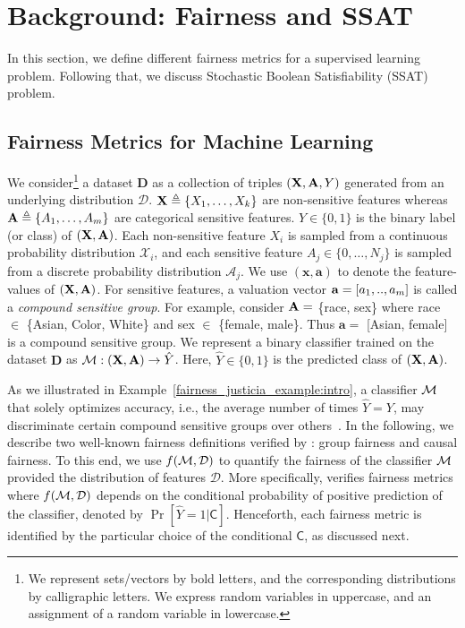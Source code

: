 \section{Background: Fairness and SSAT}
\label{fairness_justicia_sec:preliminaries}

In this section, we define different fairness metrics for a supervised learning problem. Following that, we discuss Stochastic Boolean Satisfiability (SSAT) problem.

\subsection{Fairness Metrics for Machine Learning}\label{fairness_justicia_sec:fairness}


We consider\footnote{{We represent sets/vectors by bold letters, and the corresponding distributions by calligraphic letters. We express random variables in uppercase, and an assignment of a random variable in lowercase.}} a dataset $ \mathbf{D} $ as a collection of triples $ (\mathbf{X}, \mathbf{A}, Y) $ generated from an underlying distribution $\mathcal{D}$. $ \mathbf{X} \triangleq \{X_1, \dots, X_{k}\} $ are non-sensitive features whereas $ \mathbf{A} \triangleq \{A_1, \dots, A_{m}\} $ are categorical sensitive features.  $Y \in \{0,1\}$ is the binary label (or class) of $(\mathbf{X},\mathbf{A})$. Each non-sensitive feature $ X_i$ is sampled from a continuous probability distribution {$ \mathcal{X}_i $}, and each sensitive feature $ A_j \in \{0, \dots, N_j\}  $ is sampled from a discrete probability distribution {$ \mathcal{A}_j $}. We use $ (\mathbf{x}, \mathbf{a}) $ to denote the feature-values of  $ (\mathbf{X}, \mathbf{A}) $.  For sensitive features, a valuation vector $ \mathbf{a} = [a_1, .., a_{m}] $ is called a \textit{compound sensitive group}. For example, consider $ \mathbf{A} = $ \{race, sex\} where race $ \in $ \{Asian, Color, White\} and sex $ \in $ \{female, male\}. Thus $ \mathbf{a} = $ [Asian, female]  is a compound sensitive group. 
We represent a binary classifier trained on the dataset $\mathbf{D}$ as $\mathcal{M}: (\mathbf{X}, \mathbf{A}) \rightarrow \hat{Y} $. Here, $\hat{Y} \in \{0,1\}$ is the predicted class of $ (\mathbf{X}, \mathbf{A}) $.




As we illustrated in Example~\ref{fairness_justicia_example:intro}, a classifier $\mathcal{M}$ that solely optimizes accuracy, i.e., the average number of times $\hat{Y} = Y$, may discriminate certain compound sensitive groups over others~\cite{chouldechova2020snapshot}. In the following, we describe two well-known fairness definitions verified by {\justicia}: group fairness and causal fairness. To this end, we use $ f(\mathcal{M}, \mathcal{D}) $ to quantify the fairness of the classifier $ \mathcal{M} $ provided the distribution of features $ \mathcal{D} $. More specifically,  {\justicia} verifies fairness metrics where $ f(\mathcal{M}, \mathcal{D}) $ depends on the conditional probability of positive prediction of the classifier, denoted by $ \Pr[\hat{Y} = 1 | \mathsf{C}] $. Henceforth, each fairness metric is identified by the particular choice of the conditional $ \mathsf{C} $, as discussed next.

